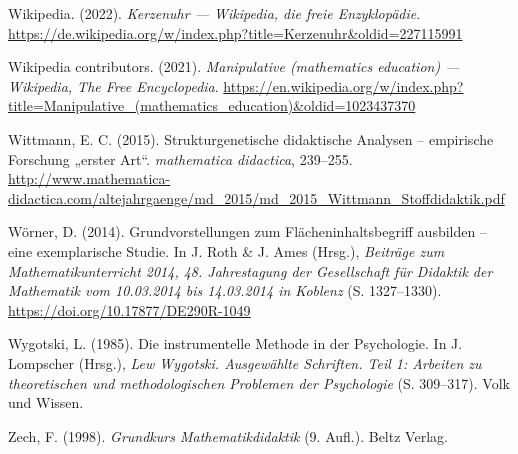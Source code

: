 \documentclass[
]{scrbook}
\newlength{\cslhangindent}
\newlength{\cslentryspacingunit} %
\newenvironment{CSLReferences}[2] %
 {%
  \setlength{\parindent}{0pt}
  \ifodd #1
  \let\oldpar\par
  \def\par{\hangindent=\cslhangindent\oldpar}
  \fi
  \setlength{\parskip}{#2\cslentryspacingunit}
 }%
 {}
\theoremstyle{definition}
\theoremstyle{definition}
\theoremstyle{definition}
\theoremstyle{definition}
\theoremstyle{remark}
\begin{document}
\begin{CSLReferences}{1}{0}
\leavevmode{}%
Wikipedia. (2022). \emph{Kerzenuhr --- Wikipedia{,} die freie Enzyklopädie}. \url{https://de.wikipedia.org/w/index.php?title=Kerzenuhr\&oldid=227115991}

\leavevmode{}%
Wikipedia contributors. (2021). \emph{Manipulative (mathematics education) --- {Wikipedia}{,} The Free Encyclopedia}. \url{https://en.wikipedia.org/w/index.php?title=Manipulative_(mathematics_education)\&oldid=1023437370}

\leavevmode{}%
Wittmann, E. C. (2015). Strukturgenetische didaktische {Analysen} -- empirische {Forschung} „erster {Art}``. \emph{mathematica didactica}, 239--255. \url{http://www.mathematica-didactica.com/altejahrgaenge/md_2015/md_2015_Wittmann_Stoffdidaktik.pdf}

\leavevmode{}%
Wörner, D. (2014). Grundvorstellungen zum {Flächeninhaltsbegriff} ausbilden -- eine exemplarische {Studie}. In J. Roth \& J. Ames (Hrsg.), \emph{Beiträge zum {Mathematikunterricht} 2014, 48. {Jahrestagung} der {Gesellschaft} für {Didaktik} der {Mathematik} vom 10.03.2014 bis 14.03.2014 in {Koblenz}} (S. 1327--1330). \url{https://doi.org/10.17877/DE290R-1049}

\leavevmode{}%
Wygotski, L. (1985). Die instrumentelle {Methode} in der {Psychologie}. In J. Lompscher (Hrsg.), \emph{Lew {Wygotski}. {Ausgewählte} {Schriften}. {Teil} 1: {Arbeiten} zu theoretischen und methodologischen {Problemen} der {Psychologie}} (S. 309--317). Volk und Wissen.

\leavevmode{}%
Zech, F. (1998). \emph{Grundkurs {Mathematikdidaktik}} (9. Aufl.). Beltz Verlag.

\end{CSLReferences}

\printindex
\end{document}
